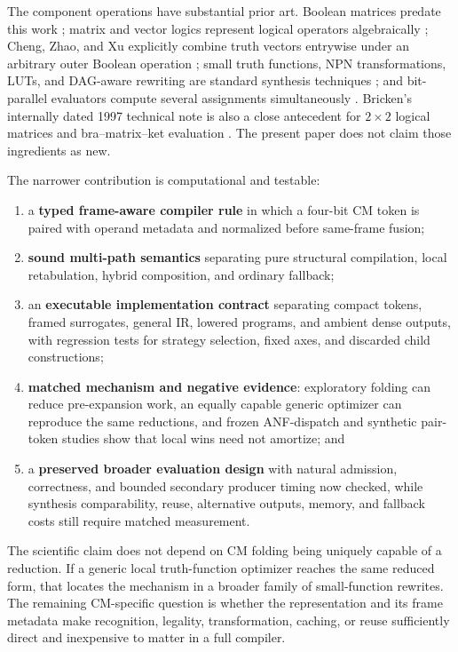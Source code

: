 \documentclass[10pt]{article}
\theoremstyle{plain}
\theoremstyle{definition}
\theoremstyle{remark}
\begin{document}
The component operations have substantial prior art. Boolean matrices predate this work \cite{Edwards1972}; matrix and vector logics represent logical operators algebraically \cite{Stern1988,Mizraji1992,Mizraji2008}; Cheng, Zhao, and Xu explicitly combine truth vectors entrywise under an arbitrary outer Boolean operation \cite{Cheng2011}; small truth functions, NPN transformations, LUTs, and DAG-aware rewriting are standard synthesis techniques \cite{Mishchenko2006,Zhou2019,Testa2019}; and bit-parallel evaluators compute several assignments simultaneously \cite{Lee2022}. Bricken's internally dated 1997 technical note is also a close antecedent for $2\times2$ logical matrices and bra--matrix--ket evaluation \cite{Bricken1997}. The present paper does not claim those ingredients as new.

The narrower contribution is computational and testable:
\begin{enumerate}
  \item a \textbf{typed frame-aware compiler rule} in which a four-bit CM token is paired with operand metadata and normalized before same-frame fusion;
  \item \textbf{sound multi-path semantics} separating pure structural compilation, local retabulation, hybrid composition, and ordinary fallback;
  \item an \textbf{executable implementation contract} separating compact tokens, framed surrogates, general IR, lowered programs, and ambient dense outputs, with regression tests for strategy selection, fixed axes, and discarded child constructions;
  \item \textbf{matched mechanism and negative evidence}: exploratory folding can reduce pre-expansion work, an equally capable generic optimizer can reproduce the same reductions, and frozen ANF-dispatch and synthetic pair-token studies show that local wins need not amortize; and
  \item a \textbf{preserved broader evaluation design} with natural admission, correctness, and bounded secondary producer timing now checked, while synthesis comparability, reuse, alternative outputs, memory, and fallback costs still require matched measurement.
\end{enumerate}

The scientific claim does not depend on CM folding being uniquely capable of a reduction. If a generic local truth-function optimizer reaches the same reduced form, that locates the mechanism in a broader family of small-function rewrites. The remaining CM-specific question is whether the representation and its frame metadata make recognition, legality, transformation, caching, or reuse sufficiently direct and inexpensive to matter in a full compiler.
\end{document}

